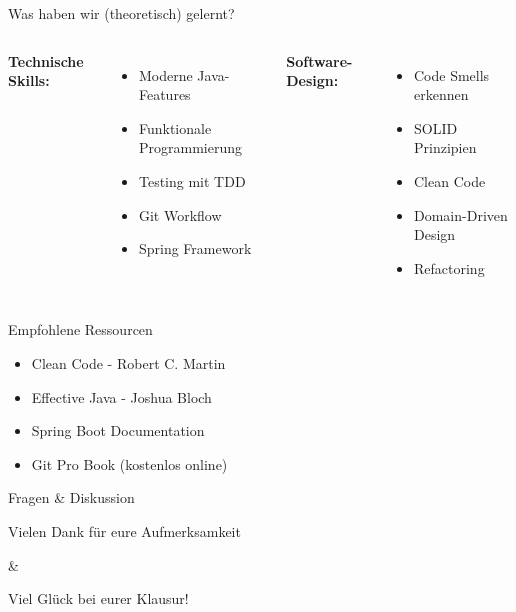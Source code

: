 \documentclass[10pt, aspectratio=169, t, hyperref={pdfpagelabels=true}]{beamer}
\begin{document}
  \begin{frame}{Was haben wir (theoretisch) gelernt?}
    \begin{columns}
      \textbf{Technische Skills:}
      \begin{itemize}
        \item Moderne Java-Features
        \item Funktionale Programmierung
        \item Testing mit TDD
        \item Git Workflow
        \item Spring Framework
      \end{itemize}

      \textbf{Software-Design:}
      \begin{itemize}
        \item Code Smells erkennen
        \item SOLID Prinzipien
        \item Clean Code
        \item Domain-Driven Design
        \item Refactoring
      \end{itemize}
    \end{columns}

    \begin{exampleblock}{Empfohlene Ressourcen}
      \begin{itemize}
        \item Clean Code - Robert C. Martin
        \item Effective Java - Joshua Bloch
        \item Spring Boot Documentation
        \item Git Pro Book (kostenlos online)
      \end{itemize}
    \end{exampleblock}
  \end{frame}

  \begin{frame}{Fragen \& Diskussion}
    \vspace{1cm}
    \Large
    \begin{center}
      Vielen Dank für eure Aufmerksamkeit

      \vspace{0.5cm}

      \&

      \vspace{0.5cm}

      Viel Glück bei eurer Klausur!
    \end{center}
  \end{frame}
\end{document}
